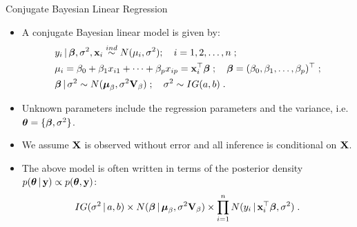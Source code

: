 \begin{frame}{Conjugate Bayesian Linear Regression}
 
\begin{itemize}\setlength{\itemsep}{0.4cm}
 \item \vskip-2mm A conjugate Bayesian linear model is given by:
\begin{align*}
& y_i\,|\, \mbox{\boldmath $ \beta $},\sigma^2, \textbf{x}_i \stackrel{ind}{\sim} N(\mu_i,\sigma^2);\quad i=1,2,\ldots,n\;;\\
& \mu_i = \beta_0 + \beta_1x_{i1} + \cdots + \beta_{p} x_{ip} = \textbf{x}_i^{\top}\mbox{\boldmath $ \beta $}\;;\quad \mbox{\boldmath $ \beta $} = (\beta_0,\beta_1,\ldots,\beta_{p})^{\top}\;; \\
& \mbox{\boldmath $ \beta $} \,|\, \sigma^2 \sim N(\mbox{\boldmath $\mu$}_{\beta}, \sigma^2 \textbf{V}_{\beta})\;;\quad  \sigma^2 \sim IG(a,b)\; .
\end{align*}

\item Unknown parameters include the regression parameters and the variance, i.e. $\mbox{\boldmath $ \theta $} = \{\mbox{\boldmath $ \beta $}, \sigma^2\}$. 

\item We assume $\textbf{X}$ is observed without error and all inference is conditional on $\textbf{X}$.

\item The above model is often written in terms of the posterior density $p(\mbox{\boldmath $ \theta $} \,|\, \textbf{y}) \propto p(\mbox{\boldmath $ \theta $}, \textbf{y})$:
\begin{align*}
 IG(\sigma^2\,|\, a,b) \times N(\mbox{\boldmath $ \beta $} \,|\, \mbox{\boldmath $\mu$}_{\beta}, \sigma^2 \textbf{V}_{\beta}) \times \prod_{i=1}^n N(y_i \,|\, \textbf{x}_i^{\top}\mbox{\boldmath $ \beta $}, \sigma^2)\;.
\end{align*}

\end{itemize}

\end{frame}


